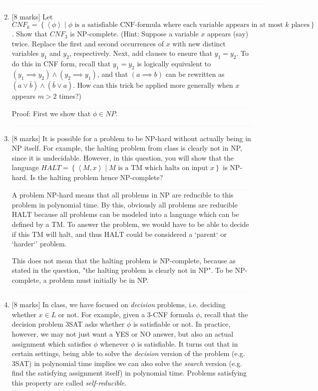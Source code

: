\documentclass{article}
\newcommand{\class}[1]{\text{#1}}
\newcommand{\set}[1]{{\left\{#1\right\}}}    %
\newcommand{\enc}[1]{\left<#1\right>}
\begin{document}
\begin{enumerate}
\begin{enumerate}
            $\textcolor[RGB]{220,220,220}{\rule{\linewidth}{0.2pt}}$


    \end{enumerate}
    \item {[8 marks]} Let $CNF_k=\set{\enc{\phi}\mid\phi\text{ is a satisfiable CNF-formula where each variable appears in at most }k\text{ places}}$. Show that ${CNF}_3$ is NP-complete. (Hint: Suppose a variable $x$ appears (say) twice. Replace the first and second occurrences of $x$ with new distinct variables $y_1$ and $y_2$, respectively. Next, add clauses to ensure that $y_1=y_2$. To do this in CNF form, recall that $y_1=y_2$ is logically equivalent to $(y_1\implies y_2)\wedge(y_2\implies y_1)$, and that $(a\implies b)$ can be rewritten as $(a\vee \bar{b})\wedge (\bar{b}\vee {a})$. How can this trick be applied more generally when $x$ appears $m>2$ times?)


            $\textcolor[RGB]{220,220,220}{\rule{\linewidth}{0.2pt}}$
            Proof: First we show that $\phi \in NP$.

            $\textcolor[RGB]{220,220,220}{\rule{\linewidth}{0.2pt}}$

    \item {[8 marks]} It is possible for a problem to be NP-hard without actually being in NP itself. For example, the halting problem from class is clearly not in NP, since it is undecidable. However, in this question, you will show that the language $HALT=\set{\enc{M,x}\mid M\text{ is a TM which halts on input }x}$ is NP-hard. Is the halting problem hence NP-complete?


            $\textcolor[RGB]{220,220,220}{\rule{\linewidth}{0.2pt}}$
            A problem NP-hard means that all problems in NP are reducible to this problem in polynomial time. By this, obviously all problems are reducible $\class{HALT}$ because all problems can be modeled into a language which can be defined by a TM. To answer the problem, we would have to be able to decide if this TM will halt, and thus $\class{HALT}$ could be considered a `parent` or `harder`' problem.

            This does not mean that the halting problem is NP-complete, because as stated in the question, "the halting problem is clearly not in NP". To be NP-complete, a problem must initially be in NP.

            $\textcolor[RGB]{220,220,220}{\rule{\linewidth}{0.2pt}}$

    \item {[8 marks]} In class, we have focused on \emph{decision} problems, i.e. deciding whether $x\in L$ or not. For example, given a 3-CNF formula $\phi$, recall that the decision problem 3SAT asks whether $\phi$ is satisfiable or not. In practice, however, we may not just want a YES or NO answer, but also an actual assignment which satisfies $\phi$ whenever $\phi$ is satisfiable. It turns out that in certain settings, being able to solve the \emph{decision} version of the problem (e.g. 3SAT) in polynomial time implies we can also solve the \emph{search} version (e.g. find the satisfying assignment itself) in polynomial time. Problems satisfying this property are called \emph{self-reducible}.


\end{enumerate}
\end{document}

